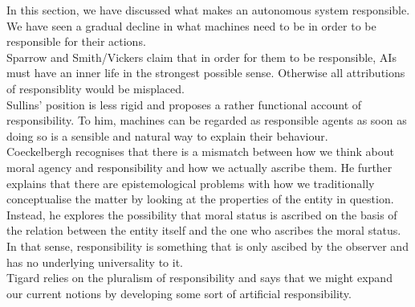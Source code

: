 \documentclass{article}
\begin{document}
In this section, we have discussed what makes an autonomous system responsible.
We have seen a gradual decline in what machines need to be in order to be
responsible for their actions.\\
Sparrow and Smith/Vickers claim that in order for them to be responsible, AIs
must have an inner life in the strongest possible sense. Otherwise all
attributions of responsiblity would be misplaced.\\
Sullins' position is less rigid and proposes a rather functional account of
responsibility. To him, machines can be regarded as responsible agents as soon
as doing so is a sensible and natural way to explain their behaviour.\\
Coeckelbergh recognises that there is a mismatch between how we think about
moral agency and responsibility and how we actually ascribe them. He further
explains that there are epistemological problems with how we traditionally
conceptualise the matter by looking at the properties of the entity in question.
Instead, he explores the possibility that moral status is ascribed on the basis
of the relation between the entity itself and the one who ascribes the moral
status. In that sense, responsibility is something that is only ascibed by the
observer and has no underlying universality to it.\\
Tigard relies on the pluralism of responsibility and says that we might
expand our current notions by developing some sort of artificial responsibility.\\



%
%



\end{document}
